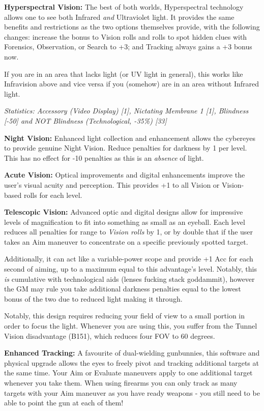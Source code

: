 \begin{multicols*}{3}
	\textbf{Hyperspectral Vision:} The best of both worlds, Hyperspectral technology allows one to see both Infrared \textit{and} Ultraviolet light. It provides the same benefits and restrictions as the two options themselves provide, with the following changes: increase the bonus to Vision rolls and rolls to spot hidden clues with Forensics, Observation, or Search to +3; and Tracking always gains a +3 bonus now.
	
	If you are in an area that lacks light (or UV light in general), this works like Infravision above and vice versa if you (somehow) are in an area without Infrared light.
	
	\textit{\textcolor{OliveGreen}{Statistics: Accessory (Video Display) [1], Nictating Membrane 1 [1], Blindness [-50] and NOT Blindness (Technological, -35\%) [33]}}
	
	\textbf{Night Vision:} Enhanced light collection and enhancement allows the cybereyes to provide genuine Night Vision. Reduce penalties for darkness by 1 per level. This has no effect for -10 penalties as this is an \textit{absence} of light.
	
	\textbf{Acute Vision:} Optical improvements and digital enhancements improve the user's visual acuity and perception. This provides +1 to all Vision or Vision-based rolls for each level.
	
	\textbf{Telescopic Vision:} Advanced optic and digital designs allow for impressive levels of magnification to fit into something as small as an eyeball. Each level reduces all penalties for range to \textit{Vision rolls} by 1, or by double that if the user takes an Aim maneuver to concentrate on a specific previously spotted target. 
	
	Additionally, it can act like a variable-power scope and provide +1 Acc for each second of aiming, up to a maximum equal to this advantage's level. Notably, this \textit{is} cumulative with technological aids (lenses fucking stack goddammit), however the GM may rule you take additional darkness penalties equal to the lowest bonus of the two due to reduced light making it through.
	
	Notably, this design requires reducing your field of view to a small portion in order to focus the light. Whenever you are using this, you suffer from the Tunnel Vision disadvantage (B151), which reduces four FOV to 60 degrees.
	
	\textbf{Enhanced Tracking:} A favourite of dual-wielding gunbunnies, this software and physical upgrade allows the eyes to freely pivot and tracking additional targets at the same time. Your Aim or Evaluate maneuvers apply to one additional target whenever you take them. When using firearms you can only track as many targets with your Aim maneuver as you have ready weapons - you still need to be able to point the gun at each of them!
	

\end{multicols*}

